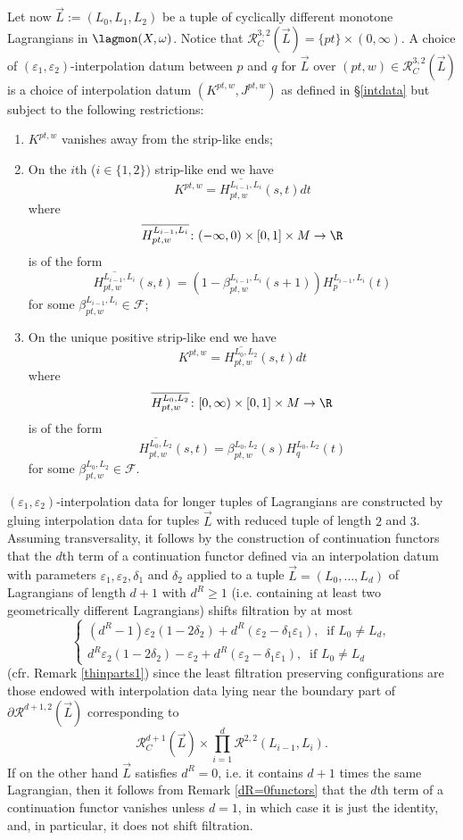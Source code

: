 	Let now $\vec{L}:=(L_0,L_1,L_2)$ be a tuple of cyclically different monotone Lagrangians in $\lagmon(X,\omega)$. Notice that $\mathcal{R}^{3,2}_C(\vec{L})=\{pt\}\times (0,\infty)$. A choice of $(\varepsilon_1,\varepsilon_2)$-interpolation datum between $p$ and $q$ for $\vec{L}$ over $(pt,w)\in \mathcal{R}^{3,2}_C(\vec{L})$ is a choice of interpolation datum $(K^{pt,w}, J^{pt,w})$ as defined in \S \ref{intdata} but subject to the following restrictions: 
	\begin{enumerate}
		\item $K^{pt,w}$ vanishes away from the strip-like ends;
		\item On the $i$th ($i\in \{1,2\})$ strip-like end we have $$K^{pt,w} = \overline{H^{L_{i-1},L_i}_{pt,w}}(s,t)dt$$ where $$\overline{H^{L_{i-1},L_i}_{pt,w}}\colon (-\infty, 0)\times [0,1]\times M\to \R$$ is of the form $$\overline{H^{L_{i-1},L_i}_{pt,w}}(s,t)= (1-\beta^{L_{i-1},L_i}_{pt,w}(s+1))H^{L_{i-1},L_i}_{p}(t)$$ for some $\beta^{L_{i-1},L_i}_{pt,w}\in \mathcal{F}$;
		\item On the unique positive strip-like end we have $$K^{pt,w} = \overline{H^{L_{0},L_2}_{pt,w}}(s,t)dt$$ where $$\overline{H^{L_{0},L_2}_{pt,w}}\colon[0,\infty)\times [0,1]\times M\to \R$$ is of the form $$\overline{H^{L_{0},L_2}_{pt,w}}(s,t) = \beta^{L_0,L_2}_{pt,w}(s)H^{L_0,L_2}_{q}(t)$$ for some $\beta^{L_0,L_2}_{pt,w}\in \mathcal{F}$.
	\end{enumerate}
	$(\varepsilon_1,\varepsilon_2)$-interpolation data for longer tuples of Lagrangians are constructed by gluing interpolation data for tuples $\vec{L}$ with reduced tuple of length $2$ and $3$. Assuming transversality, it follows by the construction of continuation functors that the $d$th term of a continuation functor defined via an interpolation datum with parameters $\varepsilon_1, \varepsilon_2, \delta_1$ and $\delta_2$ applied to a tuple $\vec{L} = (L_0,\ldots, L_d)$ of Lagrangians of length $d+1$ with $d^R\geq 1$ (i.e. containing at least two geometrically different Lagrangians) shifts filtration by at most $$\begin{cases}
		(d^R-1)\varepsilon_2(1-2\delta_2)+ d^R(\varepsilon_2-\delta_1\varepsilon_1), \ \text{ if }  L_0\neq L_d,\\
		d^R\varepsilon_2(1-2\delta_2)-\varepsilon_2 + d^R(\varepsilon_2-\delta_1\varepsilon_1), \ \text{ if } L_0\neq L_d
	\end{cases}$$ (cfr. Remark \ref{thinparts1}) since the least filtration preserving configurations are those endowed with interpolation data lying near the boundary part of $\partial\mathcal{R}^{d+1,2}(\vec{L})$ corresponding to $$\mathcal{R}^{d+1}_C(\vec{L})\times \prod_{i=1}^d \mathcal{R}^{2,2}(L_{i-1},L_i).$$ If on the other hand $\vec{L}$ satisfies $d^R=0$, i.e. it contains $d+1$ times the same Lagrangian, then it follows from Remark \ref{dR=0functors} that the $d$th term of a continuation functor vanishes unless $d=1$, in which case it is just the identity, and, in particular, it does not shift filtration.\\

